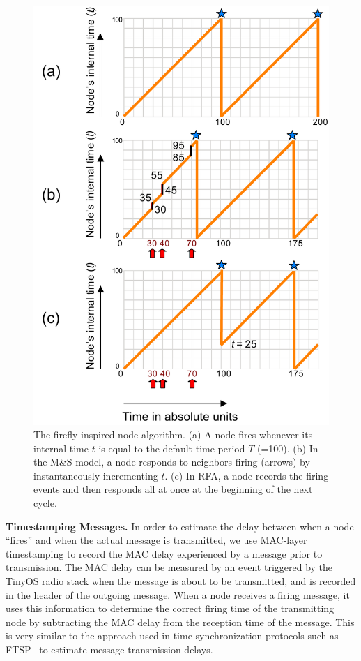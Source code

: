 \begin{figure}[t]
\begin{center}
\includegraphics[width=0.8\hsize]{./figures/firing-diagram-cropped.pdf}
\end{center}
\caption{The firefly-inspired node algorithm. (a) A node fires
whenever its internal time $t$ is equal to the default time period $T$
(=100). (b) In the M\&S model, a node responds to neighbors firing
(arrows) by instantaneously incrementing $t$. (c) In RFA, a node
records the firing events and then responds all at once at the
beginning of the next cycle.}
\label{fig:firefly-example}
\end{figure}


{\bf Timestamping Messages.} In order to estimate the delay between
when a node ``fires'' and when the actual message is transmitted, we
use MAC-layer timestamping to record the MAC delay experienced by a
message prior to transmission. The MAC delay can be measured by an
event triggered by the TinyOS radio stack when the message is about to
be transmitted, and is recorded in the header of the outgoing message.
When a node receives a firing message, it uses this information to
determine the correct firing time of the transmitting node by
subtracting the MAC delay from the reception time of the message. This
is very similar to the approach used in time synchronization protocols
such as FTSP~\cite{ftsp} to estimate message transmission delays.

